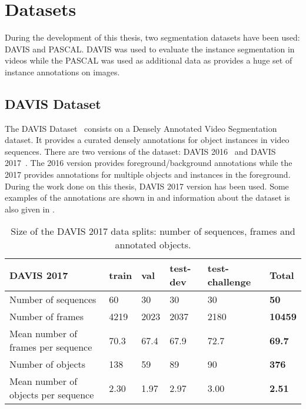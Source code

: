 \section{Datasets}

During the development of this thesis, two segmentation datasets have been used: DAVIS and PASCAL.
DAVIS was used to evaluate the instance segmentation in videos while the PASCAL was used as additional data as provides a huge set of instance annotations on images.

\subsection{DAVIS Dataset}

The DAVIS Dataset~\cite{Perazzi2016,PontTuset2017} consists on a Densely Annotated Video Segmentation dataset.
It provides a curated densely annotations for object instances in video sequences.
There are two versions of the dataset: DAVIS 2016~\cite{Perazzi2016} and DAVIS 2017~\cite{PontTuset2017}.
The 2016 version provides foreground/background annotations while the 2017 provides annotations for multiple objects and instances in the foreground.
During the work done on this thesis, DAVIS 2017 version has been used.
Some examples of the annotations are shown in  and information about the dataset is also given in .

\begin{table}[h]
  \centering
  \begin{tabular}{l|llll|l}
    \toprule
    DAVIS 2017                          & train & val  & test-dev & test-challenge & \textbf{Total} \\
    \midrule
    Number of sequences                 & 60    & 30   & 30       & 30             & \textbf{50}    \\
    Number of frames                    & 4219  & 2023 & 2037     & 2180           & \textbf{10459} \\
    Mean number of frames per sequence  & 70.3  & 67.4 & 67.9     & 72.7           & \textbf{69.7}  \\
    Number of objects                   & 138   & 59   & 89       & 90             & \textbf{376}   \\
    Mean number of objects per sequence & 2.30  & 1.97 & 2.97     & 3.00           & \textbf{2.51} \\
    \bottomrule
  \end{tabular}
  \caption{Size of the DAVIS 2017 data splits: number of sequences, frames and annotated objects.}
  \label{tab:davis}
\end{table}

